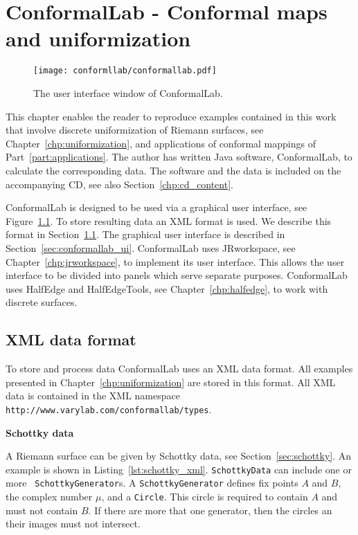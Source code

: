 \documentclass[Thesis.tex]{subfiles}
\begin{document}
\chapter{{\sc ConformalLab} - Conformal maps and uniformization}
\label{chp:conformallab}

\begin{figure}
\centering
\texttt{[image: conformllab/conformallab.pdf]}
\caption{The user interface window of {\sc ConformalLab}.}
\label{fig:conformal_window}
\end{figure}

This chapter enables the reader to reproduce examples contained in this work
that involve discrete uniformization of Riemann surfaces, see
Chapter~\ref{chp:uniformization}, and applications of conformal mappings of
Part~\ref{part:applications}. The author has written {\sc Java} software, {\sc
ConformalLab}, to calculate the corresponding data.  The software and the data
is included on the accompanying CD, see also Section~\ref{chp:cd_content}. 

{\sc ConformalLab} is designed to be used via a graphical user interface, see
Figure~\ref{fig:conformal_window}. To store resulting data an XML format is
used. We describe this format in Section~\ref{sec:conformal_data}. The
graphical user interface is described in Section~\ref{sec:conformallab_ui}.
{\sc ConformalLab} uses {\sc JRworkspace}, see Chapter~\ref{chp:jrworkspace},
to implement its user interface. This allows the user interface to be divided
into panels which serve separate purposes.  {\sc ConformalLab} uses {\sc
HalfEdge} and {\sc HalfEdgeTools}, see Chapter~\ref{chp:halfedge}, to work with
discrete surfaces.


\section{XML data format}
\label{sec:conformal_data}
To store and process data {\sc ConformalLab} uses an {\sc XML} data format.
All examples presented in Chapter~\ref{chp:uniformization} are stored in
this format.  All XML data is contained in the XML namespace {\tt
http://www.varylab.com/conformallab/types}.


{\bf Schottky data} 

A Riemann surface can be given by Schottky data, see Section~\ref{sec:schottky}. 
An example is shown in
Listing~\ref{lst:schottky_xml}. {\tt SchottkyData} can include one or more {\tt
SchottkyGenerator}s. A {\tt SchottkyGenerator} defines fix points $A$ and
$B$, the complex number $\mu$, and a {\tt Circle}. This circle is required to
contain $A$ and must not contain $B$. If there are more that one generator,
then the circles an their images must not intersect.
\end{document}
